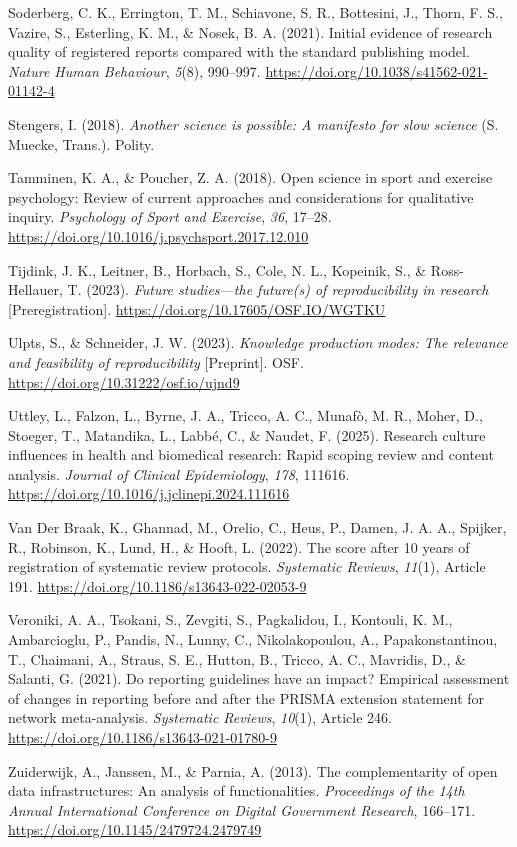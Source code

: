 \documentclass[authordate, meta]{jote-new-article}
\begin{document}
	Soderberg, C. K., Errington, T. M., Schiavone, S. R., Bottesini, J., Thorn, F. S., Vazire, S., Esterling, K. M., \& Nosek, B. A. (2021). Initial evidence of research quality of registered reports compared with the standard publishing model. \emph{Nature Human Behaviour}, \emph{5}(8), 990--997. \url{https://doi.org/10.1038/s41562-021-01142-4}



	Stengers, I. (2018). \emph{Another science is possible: A manifesto for slow science} (S. Muecke, Trans.). Polity.



	Tamminen, K. A., \& Poucher, Z. A. (2018). Open science in sport and exercise psychology: Review of current approaches and considerations for qualitative inquiry. \emph{Psychology of Sport and Exercise}, \emph{36}, 17--28. \url{https://doi.org/10.1016/j.psychsport.2017.12.010}



	Tijdink, J. K., Leitner, B., Horbach, S., Cole, N. L., Kopeinik, S., \& Ross-Hellauer, T. (2023). \emph{Future studies—the future(s) of reproducibility in research} [Preregistration]. \url{https://doi.org/10.17605/OSF.IO/WGTKU}



	Ulpts, S., \& Schneider, J. W. (2023). \emph{Knowledge production modes: The relevance and feasibility of reproducibility} [Preprint]. OSF. \url{https://doi.org/10.31222/osf.io/ujnd9}



	Uttley, L., Falzon, L., Byrne, J. A., Tricco, A. C., Munafò, M. R., Moher, D., Stoeger, T., Matandika, L., Labbé, C., \& Naudet, F. (2025). Research culture influences in health and biomedical research: Rapid scoping review and content analysis. \emph{Journal of Clinical Epidemiology}, \emph{178}, 111616. \url{https://doi.org/10.1016/j.jclinepi.2024.111616}



	Van Der Braak, K., Ghannad, M., Orelio, C., Heus, P., Damen, J. A. A., Spijker, R., Robinson, K., Lund, H., \& Hooft, L. (2022). The score after 10 years of registration of systematic review protocols. \emph{Systematic Reviews}, \emph{11}(1), Article 191. \url{https://doi.org/10.1186/s13643-022-02053-9}



	Veroniki, A. A., Tsokani, S., Zevgiti, S., Pagkalidou, I., Kontouli, K. M., Ambarcioglu, P., Pandis, N., Lunny, C., Nikolakopoulou, A., Papakonstantinou, T., Chaimani, A., Straus, S. E., Hutton, B., Tricco, A. C., Mavridis, D., \& Salanti, G. (2021). Do reporting guidelines have an impact? Empirical assessment of changes in reporting before and after the PRISMA extension statement for network meta-analysis. \emph{Systematic Reviews}, \emph{10}(1), Article 246. \url{https://doi.org/10.1186/s13643-021-01780-9}



	Zuiderwijk, A., Janssen, M., \& Parnia, A. (2013). The complementarity of open data infrastructures: An analysis of functionalities. \emph{Proceedings of the 14th Annual International Conference on Digital Government Research}, 166--171. \url{https://doi.org/10.1145/2479724.2479749}
\end{document}
